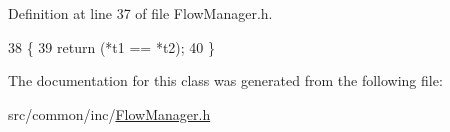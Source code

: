 Definition at line 37 of file Flow\-Manager.\-h.


\begin{DoxyCode}
38   \{
39     \textcolor{keywordflow}{return} (*t1 == *t2);
40   \}
\end{DoxyCode}


The documentation for this class was generated from the following file\-:\begin{DoxyCompactItemize}
\item 
src/common/inc/\hyperlink{_flow_manager_8h}{Flow\-Manager.\-h}\end{DoxyCompactItemize}
